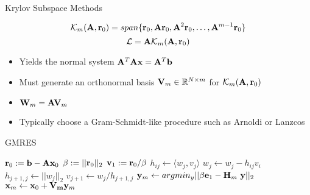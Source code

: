 \documentclass{beamer}
\begin{document}
\begin{frame}{Krylov Subspace Methods}

  \[
  \mathcal{K}_m(\mathbf{A},\mathbf{r}_0) = span\{\mathbf{r}_0, \mathbf{A}\mathbf{r}_0,
  \mathbf{A}^2\mathbf{r}_0, \dots, \mathbf{A}^{m-1}\mathbf{r}_0\}
  \]
  \[
  \mathcal{L} = \mathbf{A} \mathcal{K}_m(\mathbf{A},\mathbf{r}_0)
  \]

  \begin{itemize}
  \item Yields the normal system $\mathbf{A}^T\mathbf{A}\mathbf{x} =
    \mathbf{A}^T\mathbf{b}$
  \item Must generate an orthonormal basis $\mathbf{V}_m \in \mathbb{R}^{N
    \times m}$ for $\mathcal{K}_m(\mathbf{A},\mathbf{r}_0)$
  \item $\mathbf{W}_m = \mathbf{A}\mathbf{V}_m$
  \item Typically choose a Gram-Schmidt-like procedure such as
    Arnoldi or Lanzcos
  \end{itemize}

\end{frame}

\begin{frame}[fragile]{GMRES}

\begin{algorithm}[H]
  \begin{algorithmic}[1]
    \STATE $\mathbf{r}_0 := \mathbf{b}-\mathbf{A}\mathbf{x}_0$
    \STATE $\beta := ||\mathbf{r}_0||_2$
    \STATE $\mathbf{v}_1 := \mathbf{r}_0 / \beta$
    \STATE $h_{ij} \leftarrow \langle w_j,v_j \rangle$
    \STATE $w_j \leftarrow w_j - h_{ij}v_i$
    \ENDFOR
    \STATE $h_{j+1,j} \leftarrow ||w_j||_2$
    \STATE $v_{j+1} \leftarrow w_j / h_{j+1,j}$
    \STATE $\mathbf{y}_m \leftarrow argmin_y ||\beta \mathbf{e}_1 - \mathbf{H}_m\
    \mathbf{y}||_2 $
    \STATE $\mathbf{x}_m \leftarrow \mathbf{x}_0 + \mathbf{V_m} \mathbf{y}_m$
  \end{algorithmic}
  \caption{GMRES Iteration}
\end{algorithm}

\end{frame}
\end{document}
